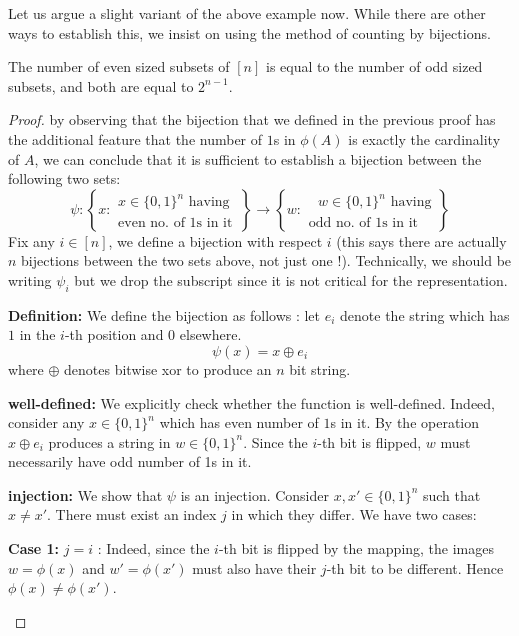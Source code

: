 Let us argue a slight variant of the above example now. While there are other ways to establish this, we insist on using the method of counting by bijections.

\begin{proposition}
The number of even sized subsets of $[n]$ is equal to the number of odd sized subsets, and both are equal to $2^{n-1}$.
\end{proposition}
\begin{proof}
by observing that the bijection that we defined in the previous proof has the additional feature that the number of $1$s in $\phi(A)$ is exactly the cardinality of $A$, we can conclude that it is sufficient to establish a bijection between the following two sets:
$$ \psi : \left\{ x : \begin{array}{c} x \in \{0,1\}^n \textrm{ having } \\ \textrm{even no. of 1s in it}  \end{array} \right\} \to \left\{ w : \begin{array}{c}  \textrm{ $w \in \{0,1\}^n$ having} \\ \textrm{odd no. of 1s in it}  \end{array} \right\}$$
Fix any $i \in [n]$, we define a bijection with respect $i$ (this says there are actually $n$ bijections between the two sets above, not just one !). Technically, we should be writing $\psi_i$ but we drop the subscript since it is not critical for the representation. 
\begin{description}
\item{\bf Definition:} We define the bijection as follows : let $e_i$ denote the string which has $1$ in the $i$-th position and $0$ elsewhere.
$$\psi(x) = x \oplus e_i $$
where $\oplus$ denotes bitwise xor to produce an $n$ bit string.
\item{\bf well-defined:} We explicitly check whether the function is well-defined. Indeed, consider any $x \in \{0,1\}^n$ which has even number of $1$s in it. By the operation $x \oplus e_i$ produces a string in $w \in \{0,1\}^n$. Since the $i$-th bit is flipped, $w$ must necessarily have odd number of 1s in it.
\item{\bf injection:} 
We show that $\psi$ is an injection. Consider $x, x' \in \{0,1\}^n$ such that $x \ne x'$.  There must exist an index $j$ in which they differ. We have two cases:
\begin{description}
\item{{\bf Case 1:} $j = i$ :} Indeed, since the $i$-th bit is flipped by the mapping, the images $w = \phi(x)$ and $w' = \phi(x')$ must also have their $j$-th bit to  be different. Hence $\phi(x) \ne \phi(x')$.

\end{description}
\end{description}
\end{proof}
